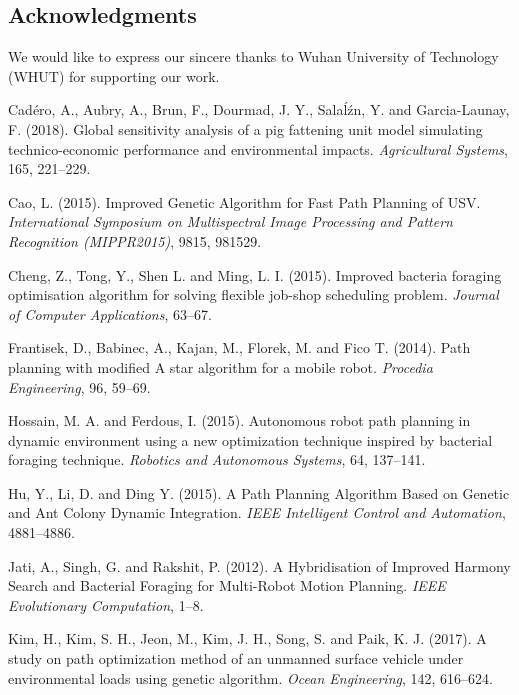 \documentclass{PDS}%
\theoremstyle{definition}
\begin{document}
\begin{Backmatter}


\section*{\color{dscolor}Acknowledgments}
We would like to express our sincere thanks to Wuhan University of Technology (WHUT) for supporting our work.



\begin{thebibliography}{}

{Cad\'ero, A., Aubry, A., Brun, F.,   Dourmad, J. Y., Sala\'l\'zn, Y.  and Garcia-Launay, F.} (2018).
Global sensitivity analysis of a pig fattening unit model simulating technico-economic performance and environmental impacts.
\textit{Agricultural Systems}, {165}, 221--229.

{Cao, L.} (2015). Improved Genetic Algorithm for Fast Path Planning of USV.
\textit{International Symposium on Multispectral Image Processing and Pattern Recognition (MIPPR2015)}, 9815, 981529.

{Cheng, Z., Tong, Y., Shen L. and Ming, L. I.} (2015). Improved bacteria foraging optimisation algorithm for solving flexible job-shop scheduling problem.
\textit{Journal of Computer Applications}, 63--67.

{Frantisek, D., Babinec, A., Kajan, M., Florek, M. and Fico T.} (2014).
Path planning with modified A star algorithm for a mobile robot. \textit{Procedia Engineering}, {96}, 59--69.

{Hossain, M. A. and Ferdous, I.} (2015).
Autonomous robot path planning in dynamic environment using a new optimization technique inspired by bacterial foraging technique.
\textit{Robotics and Autonomous Systems}, {64}, 137--141.

{Hu, Y., Li, D. and Ding Y.} (2015). A Path Planning Algorithm Based on Genetic and Ant Colony Dynamic Integration.
\textit{IEEE Intelligent Control and Automation}, 4881--4886.

{Jati, A., Singh, G. and Rakshit, P.} (2012). A Hybridisation of Improved Harmony Search and Bacterial Foraging for Multi-Robot Motion Planning.
\textit{IEEE Evolutionary Computation}, 1--8.

{Kim, H., Kim, S. H., Jeon, M., Kim, J. H., Song, S. and Paik, K. J.} (2017).
A study on path optimization method of an unmanned surface vehicle under environmental loads using genetic algorithm.
\textit{Ocean Engineering}, {142}, 616--624.


\end{thebibliography}
\end{Backmatter}
\end{document}

